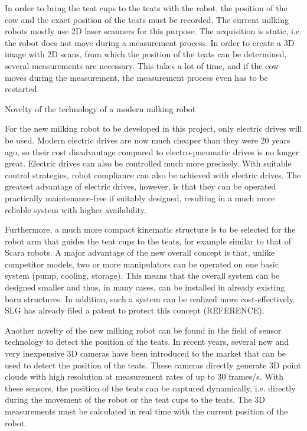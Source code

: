 In order to bring the teat cups to the teats with the robot, the position of the cow and the exact position of the teats must be recorded. The current milking robots mostly use 2D laser scanners for this purpose. The acquisition is static, i.e. the robot does not move during a measurement process. In order to create a 3D image with 2D scans, from which the position of the teats can be determined, several measurements are necessary. This takes a lot of time, and if the cow moves during the measurement, the measurement process even has to be restarted.

Novelty of the technology of a modern milking robot

For the new milking robot to be developed in this project, only electric drives will be used. Modern electric drives are now much cheaper than they were 20 years ago, so their cost disadvantage compared to electro-pneumatic drives is no longer great. Electric drives can also be controlled much more precisely. With suitable control strategies, robot compliance can also be achieved with electric drives. The greatest advantage of electric drives, however, is that they can be operated practically maintenance-free if suitably designed, resulting in a much more reliable system with higher availability.
    
Furthermore, a much more compact kinematic structure is to be selected for the robot arm that guides the teat cups to the teats, for example similar to that of Scara robots. A major advantage of the new overall concept is that, unlike competitor models, two or more manipulators can be operated on one basic system (pump, cooling, storage). This means that the overall system can be designed smaller and thus, in many cases, can be installed in already existing barn structures. In addition, such a system can be realized more cost-effectively. SLG has already filed a patent to protect this concept (REFERENCE).

Another novelty of the new milking robot can be found in the field of sensor technology to detect the position of the teats. In recent years, several new and very inexpensive 3D cameras have been introduced to the market that can be used to detect the position of the teats. These cameras directly generate 3D point clouds with high resolution at measurement rates of up to 30 frames/s. With these sensors, the position of the teats can be captured dynamically, i.e. directly during the movement of the robot or the teat cups to the teats. The 3D measurements must be calculated in real time with the current position of the robot. 

